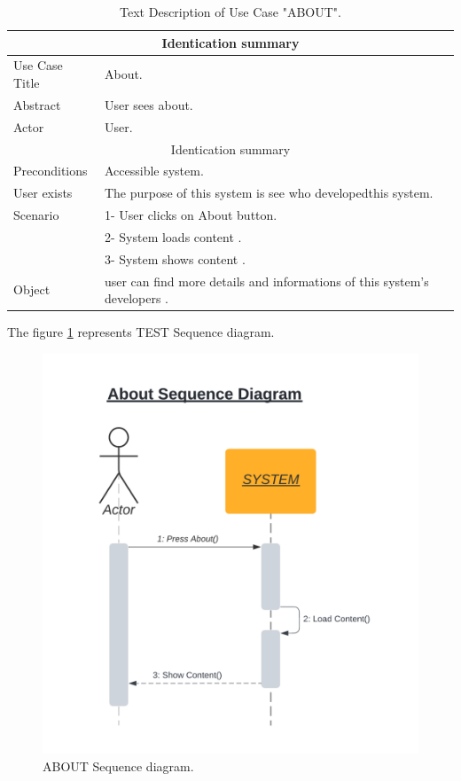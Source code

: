 \begin{table}[h!]
	\begin{center}
		\begin{tabular}{ |p{3cm}|p{9cm}|  }
			\hline
			\multicolumn{2}{|c|}{Identication summary} \\
			\hline
			Use Case Title & About. \\
			\hline
			Abstract   & User sees about. \\
		   \hline
			Actor&  User. \\
		   \hline
		   \multicolumn{2}{|c|}{Identication summary} \\
		   \hline
		   Preconditions & Accessible system.  \\
		   \hline
		   User exists    &  The purpose of this system is see who developedthis system. \\
		   \hline
		   Scenario &  1- User clicks on About button. \\ & 2- System loads content . \\ & 3- System shows content . \\ 
		   \hline
		   Object&  user can find more details and informations of this system's developers .\\
			\hline
\end{tabular}
\end{center}
\caption{Text Description of Use Case "ABOUT".}
\label{tab:DS ABOUT}
\end{table}



\newpage
The figure \ref{fig:ABOUT DS} represents TEST Sequence diagram.
\begin{figure}[ht]
	\centering
	\label{}\includegraphics[scale=0.2]{img/About Sequence diagram.png}                
	\caption{ABOUT Sequence diagram.} 
	\label{fig:ABOUT DS}
\end{figure} 


